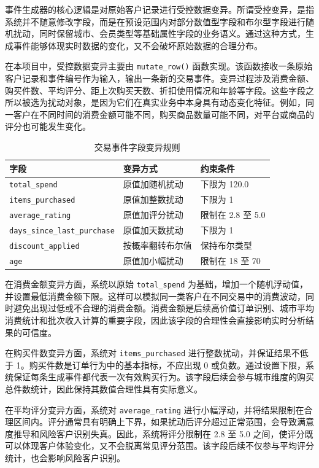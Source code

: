 \documentclass[12pt,hyperref,a4paper,UTF8]{ctexart}
\begin{document}
事件生成器的核心逻辑是对原始客户记录进行受控数据变异。所谓受控变异，是指系统并不随意修改字段，而是在预设范围内对部分数值型字段和布尔型字段进行随机扰动，同时保留城市、会员类型等基础属性字段的业务语义。通过这种方式，生成事件能够体现实时数据的变化，又不会破坏原始数据的合理分布。

在本项目中，受控数据变异主要由 \texttt{mutate\_row()} 函数实现。该函数接收一条原始客户记录和事件编号作为输入，输出一条新的交易事件。变异过程涉及消费金额、购买件数、平均评分、距上次购买天数、折扣使用情况和年龄等字段。这些字段之所以被选为扰动对象，是因为它们在真实业务中本身具有动态变化特征。例如，同一客户在不同时间的消费金额可能不同，购买商品数量可能不同，对平台或商品的评分也可能发生变化。

\begin{table}[H]
\centering
\caption{交易事件字段变异规则}
\begin{tabular}{lll}
\toprule
字段 & 变异方式 & 约束条件 \\
\midrule
\texttt{total\_spend} & 原值加随机扰动 & 下限为 120.0 \\
\texttt{items\_purchased} & 原值加整数扰动 & 下限为 1 \\
\texttt{average\_rating} & 原值加评分扰动 & 限制在 2.8 至 5.0 \\
\texttt{days\_since\_last\_purchase} & 原值加天数扰动 & 下限为 1 \\
\texttt{discount\_applied} & 按概率翻转布尔值 & 保持布尔类型 \\
\texttt{age} & 原值加小幅扰动 & 限制在 18 至 70 \\
\bottomrule
\end{tabular}
\end{table}

在消费金额变异方面，系统以原始 \texttt{total\_spend} 为基础，增加一个随机浮动值，并设置最低消费金额下限。这样可以模拟同一类客户在不同交易中的消费波动，同时避免出现过低或不合理的消费金额。消费金额是后续高价值订单识别、城市平均消费统计和批次收入计算的重要字段，因此该字段的合理性会直接影响实时分析结果的可信度。

在购买件数变异方面，系统对 \texttt{items\_purchased} 进行整数扰动，并保证结果不低于 1。购买件数是订单行为中的基本指标，不应出现 0 或负数。通过设置下限，系统保证每条生成事件都代表一次有效购买行为。该字段后续会参与城市维度的购买总件数统计，因此保持其数值合理性具有实际意义。

在平均评分变异方面，系统对 \texttt{average\_rating} 进行小幅浮动，并将结果限制在合理区间内。评分通常具有明确上下界，如果扰动后评分超过正常范围，会导致满意度推导和风险客户识别失真。因此，系统将评分限制在 2.8 至 5.0 之间，使评分既可以体现客户体验变化，又不会脱离常见评分范围。该字段后续不仅参与平均评分统计，也会影响风险客户识别。
\end{document}
